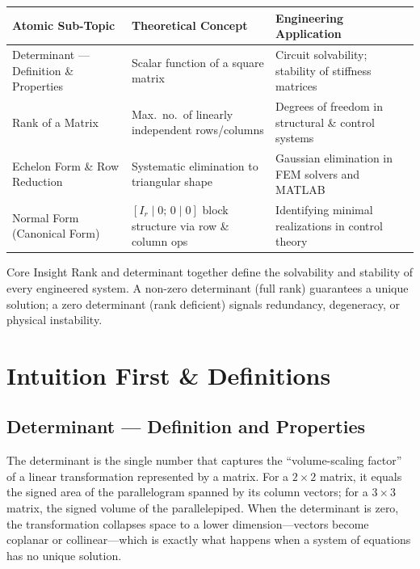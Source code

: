 \documentclass[12pt,a4paper]{article}
\begin{document}
\begin{center}
\begin{tabular}{@{}lll@{}}
\toprule
\textbf{Atomic Sub-Topic} & \textbf{Theoretical Concept} & \textbf{Engineering Application} \\
\midrule
Determinant --- Definition \& Properties
  & Scalar function of a square matrix
  & Circuit solvability; stability of stiffness matrices \\[4pt]
Rank of a Matrix
  & Max.\ no.\ of linearly independent rows/columns
  & Degrees of freedom in structural \& control systems \\[4pt]
Echelon Form \& Row Reduction
  & Systematic elimination to triangular shape
  & Gaussian elimination in FEM solvers and MATLAB \\[4pt]
Normal Form (Canonical Form)
  & $[I_r \mid 0;\, 0 \mid 0]$ block structure via row \& column ops
  & Identifying minimal realizations in control theory \\
\bottomrule
\end{tabular}
\end{center}

\begin{learnbox}{Core Insight}
Rank and determinant together define the solvability and stability of every engineered system.
A non-zero determinant (full rank) guarantees a unique solution; a zero determinant (rank deficient)
signals redundancy, degeneracy, or physical instability.
\end{learnbox}

\section{Intuition First \& Definitions}

\subsection{Determinant --- Definition and Properties}

The determinant is the single number that captures the ``volume-scaling factor'' of a linear
transformation represented by a matrix. For a $2\times2$ matrix, it equals the signed area of the
parallelogram spanned by its column vectors; for a $3\times3$ matrix, the signed volume of the
parallelepiped. When the determinant is zero, the transformation collapses space to a lower
dimension---vectors become coplanar or collinear---which is exactly what happens when a system of
equations has no unique solution.
\end{document}
